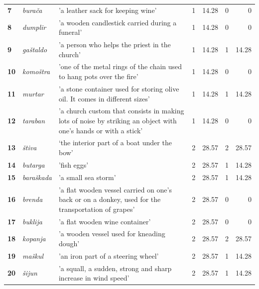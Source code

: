 \documentclass[output=paper]{LSP/langsci}
\begin{document}
\begin{table}
{\begin{tabular}{lp{}p{}lrlr}
{\bfseries 7} & {\itshape burača} & 'a leather sack for keeping wine' & 1 & 14.28 & 0 & 0\\

{\bfseries 8} & {\itshape dumplir} & 'a wooden candlestick carried during a funeral' & 1 & 14.28 & 0 & 0\\

{\bfseries 9} & {\itshape gaštaldo} & 'a person who helps the priest in the church' & 1 & 14.28 & 1 & 14.28\\

{\bfseries 10} & {\itshape komoštra} & 'one of the metal rings of the chain used to hang pots over the fire' & 1 & 14.28 & 0 & 0\\

{\bfseries 11} & {\itshape murtar} & 'a stone container used for storing olive oil. It comes in different sizes' & 1 & 14.28 & 1 & 14.28\\

{\bfseries 12} & {\itshape taraban} & 'a church custom that consists in making lots of noise by striking an object with one's hands or with a stick' & 1 & 14.28 & 0 & 0\\

{\bfseries 13} & {\itshape štiva} & ‘the interior part of a boat under the bow' & 2 & 28.57 & 2 & 28.57\\

{\bfseries 14} & {\itshape butarga} & 'fish eggs' & 2 & 28.57 & 1 & 14.28\\

{\bfseries 15} & {\itshape baraškada} & 'a small sea storm' & 2 & 28.57 & 1 & 14.28\\

{\bfseries 16} & {\itshape brenda} & 'a flat wooden vessel carried on one's back or on a donkey, used for the transportation of grapes' & 2 & 28.57 & 0 & 0\\

{\bfseries 17} & {\itshape buklija} & 'a flat wooden wine container' & 2 & 28.57 & 0 & 0\\

{\bfseries 18} & {\itshape kopanja} & 'a wooden vessel used for kneading dough' & 2 & 28.57 & 2 & 28.57\\

{\bfseries 19} & {\itshape maškul} & 'an iron part of a steering wheel' \citep[163]{filipi_betinska_1997} & 2 & 28.57 & 1 & 14.28\\

{\bfseries 20} & {\itshape šijun} & 'a squall, a sudden, strong and sharp increase in wind speed' & 2 & 28.57 & 1 & 14.28\\


\end{tabular}}
\end{table}
\end{document}
